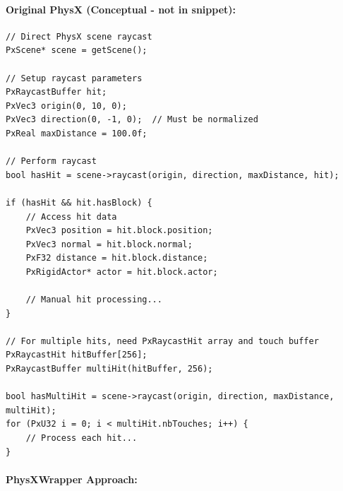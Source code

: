 \paragraph{Original PhysX (Conceptual - not in snippet):}

\begin{lstlisting}[style=cpp, caption=How Original PhysX Raycast Would Look]
// Direct PhysX scene raycast
PxScene* scene = getScene();

// Setup raycast parameters
PxRaycastBuffer hit;
PxVec3 origin(0, 10, 0);
PxVec3 direction(0, -1, 0);  // Must be normalized
PxReal maxDistance = 100.0f;

// Perform raycast
bool hasHit = scene->raycast(origin, direction, maxDistance, hit);

if (hasHit && hit.hasBlock) {
    // Access hit data
    PxVec3 position = hit.block.position;
    PxVec3 normal = hit.block.normal;
    PxF32 distance = hit.block.distance;
    PxRigidActor* actor = hit.block.actor;

    // Manual hit processing...
}

// For multiple hits, need PxRaycastHit array and touch buffer
PxRaycastHit hitBuffer[256];
PxRaycastBuffer multiHit(hitBuffer, 256);

bool hasMultiHit = scene->raycast(origin, direction, maxDistance, multiHit);
for (PxU32 i = 0; i < multiHit.nbTouches; i++) {
    // Process each hit...
}
\end{lstlisting}

\paragraph{PhysXWrapper Approach:}

